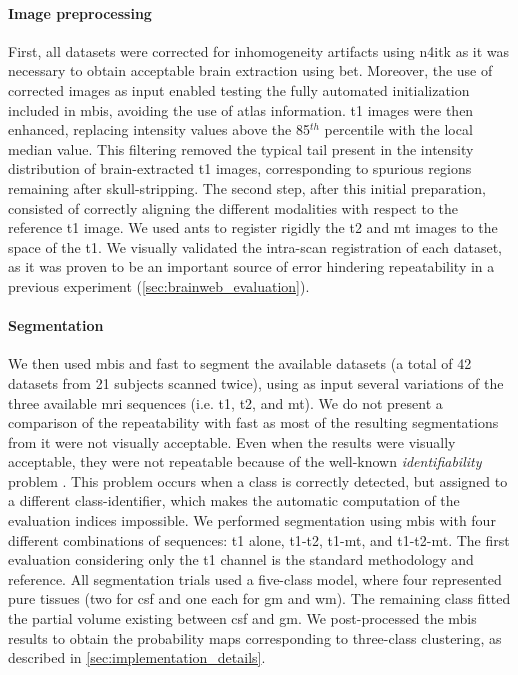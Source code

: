\paragraph{Image preprocessing}
First, all datasets were corrected for inhomogeneity artifacts using \gls*{n4itk} as
  it was necessary to obtain acceptable brain extraction using \gls*{bet}.
Moreover, the use of corrected images as input enabled testing the fully automated
  initialization included in \gls*{mbis}, avoiding the use of atlas information.
\Gls*{t1} images were then enhanced, replacing intensity values
  above the 85$^{th}$ percentile with the local median value.
This filtering removed the typical tail present in the intensity distribution of
  brain-extracted \gls*{t1} images, corresponding to spurious regions remaining
  after skull-stripping.
The second step, after this initial preparation, consisted of correctly aligning
  the different modalities with respect to the reference \gls*{t1} image.
We used \gls*{ants} to register rigidly the \gls*{t2} and \gls*{mt} images to the
  space of the \gls*{t1}.
We visually validated the intra-scan registration of each dataset, as it was
   proven to be an important source of error hindering repeatability in a previous
   experiment (\autoref{sec:brainweb_evaluation}).
   
\paragraph{Segmentation}%
We then used \gls*{mbis} and \gls*{fast} to segment the available datasets
  (a total of 42 datasets from 21 subjects scanned twice), using as input several
  variations of the three available \gls*{mri} sequences (i.e. \gls*{t1}, \gls*{t2},
  and \gls*{mt}).
We do not present a comparison of the repeatability with \gls*{fast} as most of the 
  resulting segmentations from it were not visually acceptable.
Even when the results were visually acceptable, they were not repeatable
  because of the well-known \emph{identifiability} problem \citep{bishop_pattern_2009}.
This problem occurs when a class is correctly detected, but assigned to a different 
  class-identifier, which makes the automatic computation of the evaluation indices
  impossible.
We performed segmentation using \gls*{mbis} with four different combinations of 
  sequences: \gls*{t1} alone, \gls*{t1}-\gls*{t2}, \gls*{t1}-\gls*{mt}, and 
  \gls*{t1}-\gls*{t2}-\gls*{mt}.
The first evaluation considering only the \gls*{t1} channel is the standard
  methodology and reference.
All segmentation trials used a five-class model, where four represented pure 
  tissues (two for \gls*{csf} and one each for \gls*{gm} and \gls*{wm}).
The remaining class fitted the partial volume existing between \gls*{csf} and \gls*{gm}.
We post-processed the \gls*{mbis} results to obtain the probability maps corresponding
  to three-class clustering, as described in \autoref{sec:implementation_details}.

